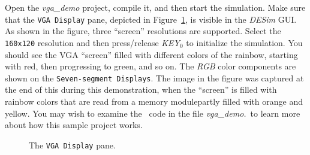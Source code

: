 {Open the {\it vga\_demo} project, compile it, and then start the simulation. Make sure
that the \texttt{VGA Display} pane, depicted in Figure~\ref{fig:vga_pane}, is visible in
the {\it DESim} GUI. As shown in the figure, three ``screen'' resolutions are supported. 
Select the \texttt{160x120} resolution and then press/release {\it KEY}$_0$ to initialize 
the simulation. You should see the VGA ``screen'' filled with different colors of the
rainbow, starting with red, then progressing to green, and so on. The {\it RGB} color components
are shown  on the \texttt{Seven-segment Displays}. The image in the figure was
captured \ifverilog at the end of this \else during this \fi demonstration, when the 
``screen'' is \ifverilog filled with rainbow colors that are read from a memory 
module\else partly filled with orange and yellow\fi. You may wish to examine the 
\hdlName~code in the file {\it vga\_demo.\hdlFileExt}~to learn more about how this sample
project works.

\begin{figure}[h]
	\begin{center}
        \setlength{\fboxsep}{0pt}
        \ifverilog
        \else
        \fi
	\end{center}
          \caption{The \texttt{VGA Display} pane.}
	\label{fig:vga_pane}
\end{figure}

}
